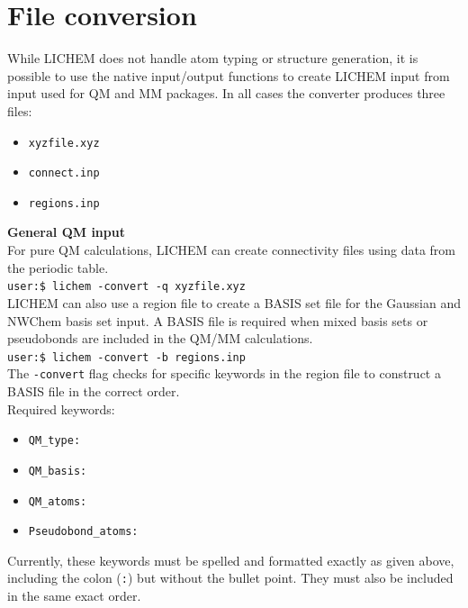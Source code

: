 \documentclass[12pt]{report}
\begin{document}
\section{File conversion}

While LICHEM does not handle atom typing or structure generation, it is
possible to use the native input/output functions to create LICHEM input from
input used for QM and MM packages.
In all cases the converter produces three files:
\begin{itemize}
\item \texttt{xyzfile.xyz}
\item \texttt{connect.inp}
\item \texttt{regions.inp}\\
\end{itemize}

{\textbf{General QM input}} \\

For pure QM calculations, LICHEM can create connectivity files using data
from the periodic table. \\

\texttt{user:\$ lichem -convert -q xyzfile.xyz} \\

LICHEM can also use a region file to create a BASIS set file for the Gaussian
and NWChem basis set input.
A BASIS file is required when mixed basis sets or pseudobonds are included
in the QM/MM calculations. \\

\texttt{user:\$ lichem -convert -b regions.inp} \\

The \texttt{-convert} flag checks for specific keywords in the region file to
construct a BASIS file in the correct order. \\

Required keywords:
\begin{itemize}
\item \texttt{QM\_type:}
\item \texttt{QM\_basis:}
\item \texttt{QM\_atoms:}
\item \texttt{Pseudobond\_atoms:}\\
\end{itemize}

Currently, these keywords must be spelled and formatted exactly as given
above, including the colon (\texttt{:}) but without the bullet point.
They must also be included in the same exact order. \\
\end{document}
